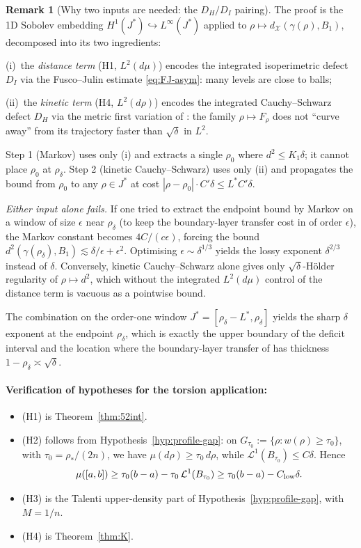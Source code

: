\documentclass[11pt]{article}
\theoremstyle{definition}
\newtheorem{remark}[theorem]{Remark}
\newcommand{\rstar}{\rho_{*}}
\newcommand{\X}{\mathcal X}
\begin{document}
\begin{remark}[Why two inputs are needed: the $D_H/D_I$ pairing]
\label{rem:why-two-inputs}
The proof is the 1D Sobolev embedding
$H^1(J^*)\hookrightarrow L^\infty(J^*)$ applied to
$\rho\mapsto d_\X(\gamma(\rho),B_1)$, decomposed into its two ingredients:

(i)~the \emph{distance term} (H1, $L^2(d\mu)$) encodes the integrated
isoperimetric defect $D_I$ via the Fusco--Julin estimate
\eqref{eq:FJ-asym}: many levels are close to balls;

(ii)~the \emph{kinetic term} (H4, $L^2(d\rho)$) encodes the
integrated Cauchy--Schwarz defect $D_H$ via the metric first variation
of \cite{MetricFramework}: the family $\rho\mapsto F_\rho$ does not
``curve away'' from its trajectory faster than $\sqrt\delta$ in
$L^2$.

Step 1 (Markov) uses only (i) and extracts a single $\rho_0$ where
$d^2\le K_1\delta$; it cannot place $\rho_0$ at $\rho_\delta$.
Step 2 (kinetic Cauchy--Schwarz) uses only (ii) and propagates the
bound from $\rho_0$ to any $\rho\in J^*$ at cost
$|\rho-\rho_0|\cdot C'\delta\le L^*C'\delta$.

\emph{Either input alone fails.} If one tried to extract the endpoint
bound by Markov on a window of size $\epsilon$ near $\rho_\delta$
(to keep the boundary-layer transfer cost in
\cite{BoundaryLayerTransfer} of order $\epsilon$), the Markov constant
becomes $4C/(c\epsilon)$, forcing the bound
$d^2(\gamma(\rho_\delta),B_1)\lesssim\delta/\epsilon+\epsilon^2$.
Optimising $\epsilon\sim\delta^{1/3}$ yields the lossy exponent
$\delta^{2/3}$ instead of $\delta$.  Conversely, kinetic Cauchy--Schwarz
alone gives only $\sqrt\delta$-H\"older regularity of $\rho\mapsto d^2$,
which without the integrated $L^2(d\mu)$ control of the distance term
is vacuous as a pointwise bound.

The combination on the order-one window $J^*=[\rho_\delta-L^*,\rho_\delta]$
yields the sharp $\delta$ exponent at the endpoint $\rho_\delta$,
which is exactly the upper boundary of the deficit interval and the
location where the boundary-layer transfer of
\cite{BoundaryLayerTransfer} has thickness $1-\rho_\delta\asymp\sqrt\delta$.
\end{remark}

\paragraph{Verification of hypotheses for the torsion application:}
\begin{itemize}
\item (H1) is Theorem~\ref{thm:52int}.
\item (H2) follows from Hypothesis~\ref{hyp:profile-gap}: on
$G_{\tau_0}:=\{\rho:w(\rho)\ge\tau_0\}$, with
$\tau_0=\rstar/(2n)$, we have $\mu(d\rho)\ge\tau_0\,d\rho$, while
$\mathcal L^1(B_{\tau_0})\le C\delta$.  Hence
\[
   \mu([a,b])\ge \tau_0(b-a)-\tau_0\,\mathcal L^1(B_{\tau_0})
   \ge \tau_0(b-a)-C_{\rm low}\delta.
\]
\item (H3) is the Talenti upper-density part of
Hypothesis~\ref{hyp:profile-gap}, with $M=1/n$.
\item (H4) is Theorem~\ref{thm:K}.
\end{itemize}
\end{document}
